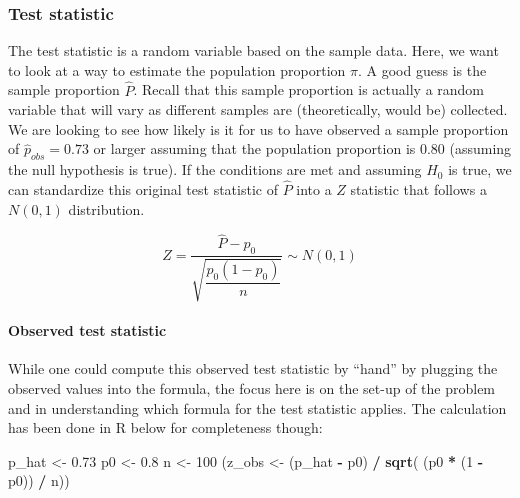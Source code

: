 \documentclass[12pt, krantz2,]{krantz}
\makeatletter
\newenvironment{Shaded}{\begin{snugshade}}{\end{snugshade}}
\newcommand{\DecValTok}[1]{\textcolor[rgb]{0.06,0.06,0.06}{#1}}
\newcommand{\FloatTok}[1]{\textcolor[rgb]{0.06,0.06,0.06}{#1}}
\newcommand{\KeywordTok}[1]{\textcolor[rgb]{0.27,0.27,0.27}{\textbf{#1}}}
\newcommand{\NormalTok}[1]{#1}
\newcommand{\OperatorTok}[1]{\textcolor[rgb]{0.43,0.43,0.43}{\textbf{#1}}}
\newcommand{\StringTok}[1]{\textcolor[rgb]{0.5,0.5,0.5}{#1}}
\let\oldparagraph\paragraph
\renewcommand{\paragraph}[1]{\oldparagraph{#1}\mbox{}}
\newenvironment{kframe}{%
\medskip{}
\setlength{\fboxsep}{.8em}
 \def\at@end@of@kframe{}%
 \ifinner\ifhmode%
  \def\at@end@of@kframe{\end{minipage}}%
  \begin{minipage}{\columnwidth}%
 \fi\fi%
 \def\FrameCommand##1{\hskip\@totalleftmargin \hskip-\fboxsep
 \colorbox{shadecolor}{##1}\hskip-\fboxsep
     \hskip-\linewidth \hskip-\@totalleftmargin \hskip\columnwidth}%
 \MakeFramed {\advance\hsize-\width
   \@totalleftmargin\z@ \linewidth\hsize
   \@setminipage}}%
 {\par\unskip\endMakeFramed%
 \at@end@of@kframe}
\renewenvironment{Shaded}{\begin{kframe}}{\end{kframe}}
\makeatother
\begin{document}
\hypertarget{test-statistic-1}{%
\subsubsection*{Test statistic}\label{test-statistic-1}}


The test statistic is a random variable based on the sample data. Here, we want to look at a way to estimate the population proportion \(\pi\). A good guess is the sample proportion \(\hat{P}\). Recall that this sample proportion is actually a random variable that will vary as different samples are (theoretically, would be) collected. We are looking to see how likely is it for us to have observed a sample proportion of \(\hat{p}_{obs} = 0.73\) or larger assuming that the population proportion is 0.80 (assuming the null hypothesis is true). If the conditions are met and assuming \(H_0\) is true, we can standardize this original test statistic of \(\hat{P}\) into a \(Z\) statistic that follows a \(N(0, 1)\) distribution.

\[ Z =\dfrac{ \hat{P} - p_0}{\sqrt{\dfrac{p_0(1 - p_0)}{n} }} \sim N(0, 1) \]

\hypertarget{observed-test-statistic-1}{%
\paragraph{Observed test statistic}\label{observed-test-statistic-1}}

While one could compute this observed test statistic by ``hand'' by plugging the observed values into the formula, the focus here is on the set-up of the problem and in understanding which formula for the test statistic applies. The calculation has been done in R below for completeness though:

\begin{Shaded}
\begin{Highlighting}[]
\NormalTok{p_hat <-}\StringTok{ }\FloatTok{0.73}
\NormalTok{p0 <-}\StringTok{ }\FloatTok{0.8}
\NormalTok{n <-}\StringTok{ }\DecValTok{100}
\NormalTok{(z_obs <-}\StringTok{ }\NormalTok{(p_hat }\OperatorTok{-}\StringTok{ }\NormalTok{p0) }\OperatorTok{/}\StringTok{ }\KeywordTok{sqrt}\NormalTok{( (p0 }\OperatorTok{*}\StringTok{ }\NormalTok{(}\DecValTok{1} \OperatorTok{-}\StringTok{ }\NormalTok{p0)) }\OperatorTok{/}\StringTok{ }\NormalTok{n))}
\end{Highlighting}
\end{Shaded}
\end{document}
